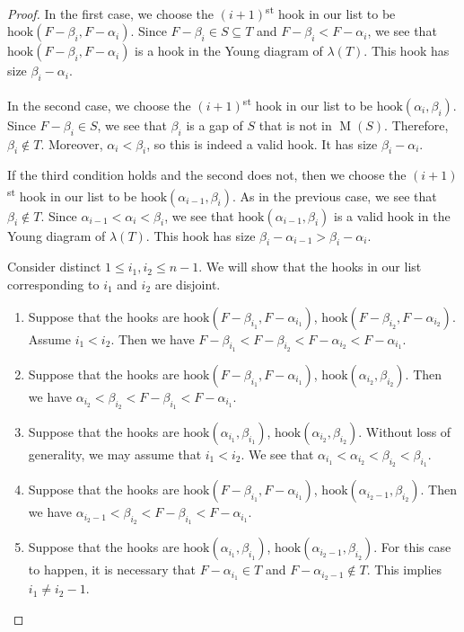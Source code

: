 \documentclass[10pt,a4paper]{amsart}
\DeclareMathOperator{\M}{M}
\newcommand{\hook}{\text{hook}}
\begin{document}
\begin{proof}
In the first case, we choose the $(i+1)$\textsuperscript{st} hook in our list to be $\hook(F-\beta_{i},F-\alpha_i)$. Since $F-\beta_i\in S\subseteq T$ and $F-\beta_i<F-\alpha_i$, we see that $\hook(F-\beta_{i},F-\alpha_i)$ is a hook in the Young diagram of $\lambda(T)$. This hook has size $\beta_i-\alpha_i$.

In the second case, we choose the $(i+1)$\textsuperscript{st} hook in our list to be $\hook(\alpha_i,\beta_i)$. Since $F-\beta_i \in S$, we see that $\beta_i$ is a gap of $S$ that is not in $\M(S)$.  Therefore, $\beta_i \not\in T$.
Moreover, $\alpha_i<\beta_i$, so this is indeed a valid hook. It has size $\beta_i-\alpha_i$.

If the third condition holds and the second does not, then we choose the $(i+1)$\textsuperscript{st} hook in our list to be $\hook(\alpha_{i-1},\beta_i)$. As in the previous case, we see that $\beta_i \not\in T$. 
Since $\alpha_{i-1}<\alpha_i<\beta_i$, we see that $\hook(\alpha_{i-1},\beta_i)$ is a valid hook in the Young diagram of $\lambda(T)$. This hook has size $\beta_i-\alpha_{i-1}>\beta_i-\alpha_i$.


Consider distinct $1\leq i_1,i_2\leq n-1$. We will show that the hooks in our list corresponding to $i_1$ and $i_2$ are disjoint.
\begin{enumerate}
    \item Suppose that the hooks are $\hook(F-\beta_{i_1},F-\alpha_{i_1})$, $\hook(F-\beta_{i_2},F-\alpha_{i_2})$. Assume $i_1<i_2$. Then we have $F-\beta_{i_1}<F-\beta_{i_2}<F-\alpha_{i_2}<F-\alpha_{i_1}$.
    \item Suppose that the hooks are $\hook(F-\beta_{i_1},F-\alpha_{i_1})$, $\hook(\alpha_{i_2},\beta_{i_2})$. Then we have $\alpha_{i_2}<\beta_{i_2}< F-\beta_{i_1}<F-\alpha_{i_1}$.
    \item Suppose that the hooks are $\hook(\alpha_{i_1},\beta_{i_1})$, $\hook(\alpha_{i_2},\beta_{i_2})$. Without loss of generality, we may assume that $i_1<i_2$. We see that $\alpha_{i_1}<\alpha_{i_2}<\beta_{i_2}<\beta_{i_1}$.
    \item Suppose that the hooks are $\hook(F-\beta_{i_1},F-\alpha_{i_1})$, $\hook(\alpha_{i_2-1},\beta_{i_2})$.
    Then we have $\alpha_{i_2-1}<\beta_{i_2}< F-\beta_{i_1}<F-\alpha_{i_1}$.
    \item Suppose that the hooks are $\hook(\alpha_{i_1},\beta_{i_1})$, $\hook(\alpha_{i_2-1},\beta_{i_2})$.
    For this case to happen, it is necessary that $F-\alpha_{i_1}\in T$ and $F-\alpha_{i_2-1}\notin T$.  This implies $i_1\neq i_2-1$.
    

\end{enumerate}
\end{proof}
\end{document}
